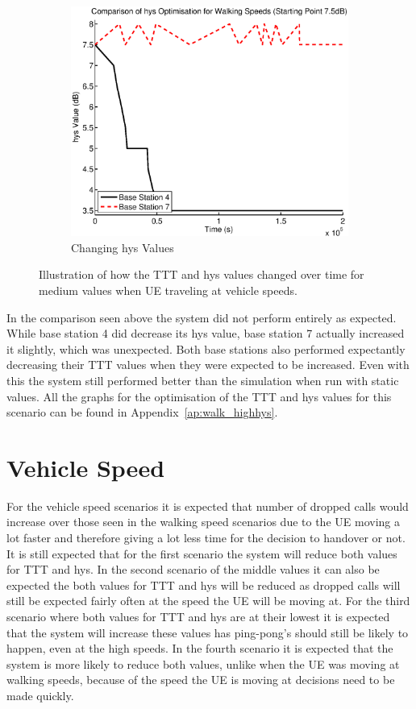 \begin{figure}[H]
\begin{subfigure}[b]{0.49\textwidth}
                \includegraphics[width=\textwidth]{figures/walking_figures/highhys/long_hys.eps}
                \caption{Changing hys Values}
                \label{fig:walk_highhys_hys}
        \end{subfigure}
        \caption{Illustration of how the TTT and hys values changed over time for medium values when UE traveling at vehicle speeds.}\label{fig:walk_highhys_ttthys}
\end{figure}
In the comparison seen above the system did not perform entirely as expected.  While base station 4 did decrease its hys value, base station 7 actually increased it slightly, which was unexpected. Both base stations also performed expectantly decreasing their TTT values when they were expected to be increased. Even with this the system still performed better than the simulation when run with static values. All the graphs for the optimisation of the TTT and hys values for this scenario can be found in Appendix~\ref{ap:walk_highhys}.

\section{Vehicle Speed}\label{veh}
For the vehicle speed scenarios it is expected that number of dropped calls would increase over those seen in the walking speed scenarios due to the UE moving a lot faster and therefore giving a lot less time for the decision to handover or not. It is still expected that for the first scenario the system will reduce both values for TTT and hys. In the second scenario of the middle values it can also be expected the both values for TTT and hys will be reduced as dropped calls will still be expected fairly often at the speed the UE will be moving at. For the third scenario where both values for TTT and hys are at their lowest it is expected that the system will increase these values has ping-pong's should still be likely to happen, even at the high speeds. In the fourth scenario it is expected that the system is more likely to reduce both values, unlike when the UE was moving at walking speeds, because of the speed the UE is moving at decisions need to be made quickly.
